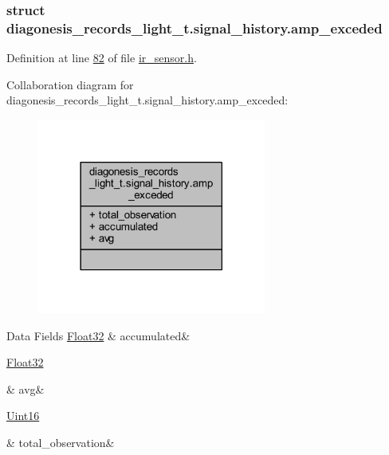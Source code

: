 \subsubsection{struct diagonesis\+\_\+records\+\_\+light\+\_\+t.\+signal\+\_\+history.\+amp\+\_\+exceded}


Definition at line \hyperlink{a00017_source_l00082}{82} of file \hyperlink{a00017_source}{ir\+\_\+sensor.\+h}.



Collaboration diagram for diagonesis\+\_\+records\+\_\+light\+\_\+t.\+signal\+\_\+history.\+amp\+\_\+exceded\+:\nopagebreak
\begin{figure}[H]
\begin{center}
\leavevmode
\includegraphics[width=213pt]{dd/d7a/a00921}
\end{center}
\end{figure}
\begin{DoxyFields}{Data Fields}
\hypertarget{a00017_a5f926b5475963464445c0d2055786b5f}{\hyperlink{a00072_a87d38f886e617ced2698fc55afa07637}{Float32}}\label{a00017_a5f926b5475963464445c0d2055786b5f}
&
accumulated&
\\
\hline

\hypertarget{a00017_ae322d423f075b0ab2daad27011d24909}{\hyperlink{a00072_a87d38f886e617ced2698fc55afa07637}{Float32}}\label{a00017_ae322d423f075b0ab2daad27011d24909}
&
avg&
\\
\hline

\hypertarget{a00017_a5c752d693b04fadbacceeaffb3adf49a}{\hyperlink{a00072_a59a9f6be4562c327cbfb4f7e8e18f08b}{Uint16}}\label{a00017_a5c752d693b04fadbacceeaffb3adf49a}
&
total\+\_\+observation&
\\
\hline

\end{DoxyFields}
\label{d3/d45/a00382}
\hypertarget{a00017_d3/d45/a00382}{}
